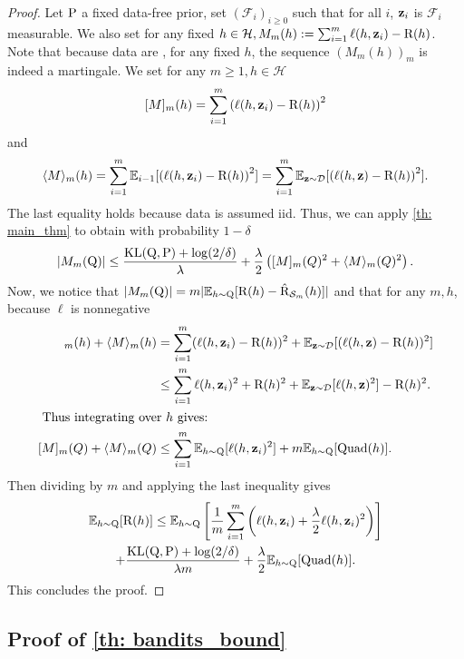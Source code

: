 \begin{noaddcontents}
\begin{proof}
Let $\P$ a fixed data-free prior, set $(\mathcal{F}_i)_{i\geq 0}$ such that for all $i$, $\z_i$ is $\mathcal{F}_i$ measurable. We also set for any fixed $h\in\mathcal{H}, M_m(h):= \sum_{i=1}^m \ell(h,\z_i) - \Risk(h)$. Note that because data are \iid, for any fixed $h$, the sequence $(M_m(h))_m$ is indeed a martingale.
We set for any $m\geq 1, h\in\mathcal{H}$
$$[M]_m(h) = \sum_{i=1}^m \left(\ell(h,\z_i) - \Risk(h)\right)^2 $$ and
$$\langle M \rangle_m(h) =  \sum_{i=1}^m \mathbb{E}_{i-1}[\left(\ell(h,\z_i) - \Risk(h)\right)^2] = \sum_{i=1}^m \mathbb{E}_{\z\sim \D}[\left(\ell(h,\z) - \Risk(h)\right)^2].$$
The last equality holds because data is assumed iid. Thus, we can apply \cref{th: main_thm} to obtain with probability $1-\delta$
\[|M_m(\Q)| \leq   \frac{\operatorname{KL}(\Q,\P) +\log(2/\delta)}{\lambda } + \frac{\lambda}{2}\left([M]_m(Q)^2 + \langle M\rangle_m(Q)^2 \right) . \]
Now, we notice that $|M_m(\Q)| = m| \mathbb{E}_{h\sim \Q}[\Risk(h) - \Riskhat_{\Sm}(h)] |$  and that  for any $m,h$, because $\ell$ is nonnegative
\begin{align*}
[M]_m(h) +  \langle M\rangle_m(h) & = \sum_{i=1}^m (\ell(h,\z_i) - \Risk(h))^2 + \mathbb{E}_{\z\sim \D}[ (\ell(h,\z) - \Risk(h))^2] \\
& \leq  \sum_{i=1}^m \ell(h,\z_i)^2 + \Risk(h)^2 + \mathbb{E}_{\z\sim \D}[\ell(h,\z)^2] - \Risk(h)^2.\\
\intertext{ Thus integrating over $h$ gives: }
[M]_m(Q) +  \langle M\rangle_m(Q) & \leq \sum_{i=1}^m \mathbb{E}_{h\sim \Q} [\ell(h,\z_i)^2] + m\mathbb{E}_{h\sim \Q} [\mathrm{Quad}(h)].
\end{align*}
Then dividing by $m$ and applying the last inequality gives
\begin{multline*}
\mathbb{E}_{h\sim \Q} [\Risk(h)]  \leq  \mathbb{E}_{h\sim \Q} \left[\frac{1}{m}\sum_{i=1}^m\left(\ell(h,\z_i) + \frac{\lambda}{2} \ell(h,\z_i)^2\right)\right] \\
+ \frac{\operatorname{KL}(\Q,\P) +\log(2/\delta)}{\lambda m} + \frac{\lambda}{2}\mathbb{E}_{h\sim \Q} [\mathrm{Quad}(h)].
\end{multline*}
This concludes the proof.
\end{proof}






\subsection{Proof of \cref{th: bandits_bound}}


\end{noaddcontents}
